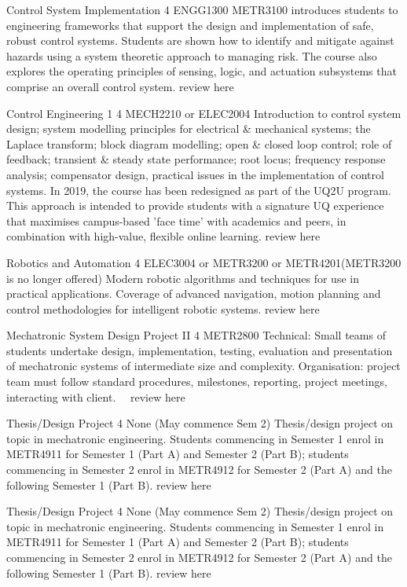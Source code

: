 {
	{Control System Implementation}
	{4}
	{ENGG1300}
	{}
	{}
	{METR3100 introduces students to engineering frameworks that support the design and implementation of safe, robust control systems. Students are shown how to identify and mitigate against hazards using a system theoretic approach to managing risk. The course also explores the operating principles of sensing, logic, and actuation subsystems that comprise an overall control system.}
	{review here}

	{Control Engineering 1}
	{4}
	{MECH2210 or ELEC2004}
	{}
	{}
	{Introduction to control system design; system modelling principles for electrical & mechanical systems; the Laplace transform; block diagram modelling; open & closed loop control; role of feedback; transient & steady state performance; root locus; frequency response analysis; compensator design, practical issues in the implementation of control systems. In 2019, the course has been redesigned as part of the UQ2U program. This approach is intended to provide students with a signature UQ experience that maximises campus-based 'face time' with academics and peers, in combination with high-value, flexible online learning.}
	{review here}

	{Robotics and Automation}
	{4}
	{ELEC3004 or METR3200 or METR4201(METR3200 is no longer offered)}
	{}
	{}
	{Modern robotic algorithms and techniques for use in practical applications. Coverage of advanced navigation, motion planning and control methodologies for intelligent robotic systems.}
	{review here}

	{Mechatronic System Design Project II}
	{4}
	{METR2800}
	{}
	{}
	{Technical: Small teams of students undertake design, implementation, testing, evaluation and presentation of mechatronic systems of intermediate size and complexity. Organisation: project team must follow standard procedures, milestones, reporting, project meetings, interacting with client. }
	{review here}

	{Thesis/Design Project}
	{4}
	{None}
	{}
	{}
	{(May commence Sem 2) Thesis/design project on topic in mechatronic engineering. Students commencing in Semester 1 enrol in METR4911 for Semester 1 (Part A) and Semester 2 (Part B); students commencing in Semester 2 enrol in METR4912 for Semester 2 (Part A) and the following Semester 1 (Part B).}
	{review here}

	{Thesis/Design Project}
	{4}
	{None}
	{}
	{}
	{(May commence Sem 2) Thesis/design project on topic in mechatronic engineering. Students commencing in Semester 1 enrol in METR4911 for Semester 1 (Part A) and Semester 2 (Part B); students commencing in Semester 2 enrol in METR4912 for Semester 2 (Part A) and the following Semester 1 (Part B).}
	{review here}

}

